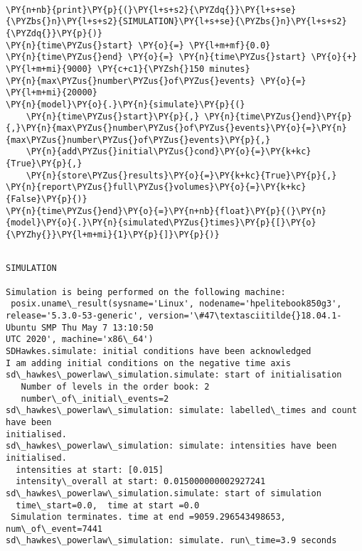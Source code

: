 \documentclass[10pt, article,table]{article}
\begin{document}
\begin{center}
    \end{center}
    { \hspace*{\fill} \\}

    \begin{tcolorbox}[breakable, size=fbox, boxrule=1pt, pad at break*=1mm,colback=cellbackground, colframe=cellborder]
\begin{Verbatim}[commandchars=\\\{\}]
\PY{n+nb}{print}\PY{p}{(}\PY{l+s+s2}{\PYZdq{}}\PY{l+s+se}{\PYZbs{}n}\PY{l+s+s2}{SIMULATION}\PY{l+s+se}{\PYZbs{}n}\PY{l+s+s2}{\PYZdq{}}\PY{p}{)}
\PY{n}{time\PYZus{}start} \PY{o}{=} \PY{l+m+mf}{0.0}
\PY{n}{time\PYZus{}end} \PY{o}{=} \PY{n}{time\PYZus{}start} \PY{o}{+} \PY{l+m+mi}{9000} \PY{c+c1}{\PYZsh{}150 minutes}
\PY{n}{max\PYZus{}number\PYZus{}of\PYZus{}events} \PY{o}{=} \PY{l+m+mi}{20000}
\PY{n}{model}\PY{o}{.}\PY{n}{simulate}\PY{p}{(}
    \PY{n}{time\PYZus{}start}\PY{p}{,} \PY{n}{time\PYZus{}end}\PY{p}{,}\PY{n}{max\PYZus{}number\PYZus{}of\PYZus{}events}\PY{o}{=}\PY{n}{max\PYZus{}number\PYZus{}of\PYZus{}events}\PY{p}{,}
    \PY{n}{add\PYZus{}initial\PYZus{}cond}\PY{o}{=}\PY{k+kc}{True}\PY{p}{,}
    \PY{n}{store\PYZus{}results}\PY{o}{=}\PY{k+kc}{True}\PY{p}{,} \PY{n}{report\PYZus{}full\PYZus{}volumes}\PY{o}{=}\PY{k+kc}{False}\PY{p}{)}
\PY{n}{time\PYZus{}end}\PY{o}{=}\PY{n+nb}{float}\PY{p}{(}\PY{n}{model}\PY{o}{.}\PY{n}{simulated\PYZus{}times}\PY{p}{[}\PY{o}{\PYZhy{}}\PY{l+m+mi}{1}\PY{p}{]}\PY{p}{)}
\end{Verbatim}
\end{tcolorbox}

    \begin{Verbatim}[commandchars=\\\{\}]

SIMULATION

Simulation is being performed on the following machine:
 posix.uname\_result(sysname='Linux', nodename='hpelitebook850g3',
release='5.3.0-53-generic', version='\#47\textasciitilde{}18.04.1-Ubuntu SMP Thu May 7 13:10:50
UTC 2020', machine='x86\_64')
SDHawkes.simulate: initial conditions have been acknowledged
I am adding initial conditions on the negative time axis
sd\_hawkes\_powerlaw\_simulation.simulate: start of initialisation
   Number of levels in the order book: 2
   number\_of\_initial\_events=2
sd\_hawkes\_powerlaw\_simulation: simulate: labelled\_times and count have been
initialised.
sd\_hawkes\_powerlaw\_simulation: simulate: intensities have been initialised.
  intensities at start: [0.015]
  intensity\_overall at start: 0.015000000002927241
sd\_hawkes\_powerlaw\_simulation.simulate: start of simulation
  time\_start=0.0,  time at start =0.0
 Simulation terminates. time at end =9059.296543498653,  num\_of\_event=7441
sd\_hawkes\_powerlaw\_simulation: simulate. run\_time=3.9 seconds
    \end{Verbatim}
\end{document}
